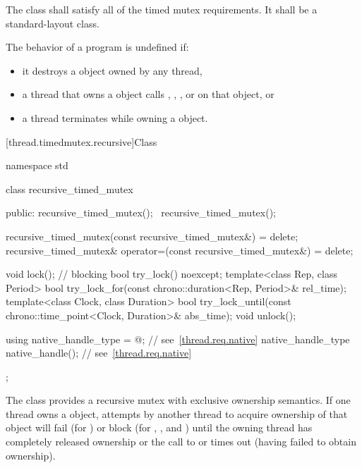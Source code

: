 \pnum
The class  shall satisfy all of the timed mutex
requirements. It shall be a standard-layout
class.

\pnum
The behavior of a program is undefined if:

\begin{itemize}
\item it destroys a  object owned by any thread,
\item a thread that owns a  object calls ,
, , or  on that object, or
\item a thread terminates while owning a  object.
\end{itemize}

[thread.timedmutex.recursive]{Class }

%
\begin{codeblock}
namespace std {
  class recursive_timed_mutex {
  public:
    recursive_timed_mutex();
    ~recursive_timed_mutex();

    recursive_timed_mutex(const recursive_timed_mutex&) = delete;
    recursive_timed_mutex& operator=(const recursive_timed_mutex&) = delete;

    void lock();    // blocking
    bool try_lock() noexcept;
    template<class Rep, class Period>
      bool try_lock_for(const chrono::duration<Rep, Period>& rel_time);
    template<class Clock, class Duration>
      bool try_lock_until(const chrono::time_point<Clock, Duration>& abs_time);
    void unlock();

    using native_handle_type = @\impdefnc@;          // see~\ref{thread.req.native}
    native_handle_type native_handle();                         // see~\ref{thread.req.native}
  };
}
\end{codeblock}

\pnum
The class  provides a recursive mutex with exclusive
ownership semantics. If one thread owns a  object,
attempts by another thread to acquire ownership of that object will fail (for
) or block (for , , and
) until the owning thread has completely released
ownership or the call to  or 
times out (having failed to obtain ownership).

